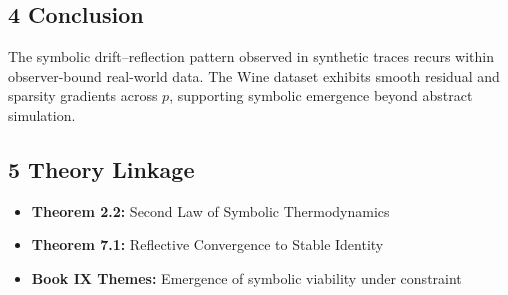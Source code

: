 \subsection*{4 Conclusion}
\label{subsection:trace6_conclusion}

The symbolic drift–reflection pattern observed in synthetic traces recurs within observer-bound real-world data. The Wine dataset exhibits smooth residual and sparsity gradients across $p$, supporting symbolic emergence beyond abstract simulation.

\subsection*{5 Theory Linkage}
\label{subsection:trace6_theory_linkage}

\begin{itemize}
    \item \textbf{Theorem 2.2:} Second Law of Symbolic Thermodynamics
    \item \textbf{Theorem 7.1:} Reflective Convergence to Stable Identity
    \item \textbf{Book IX Themes:} Emergence of symbolic viability under constraint
\end{itemize}
